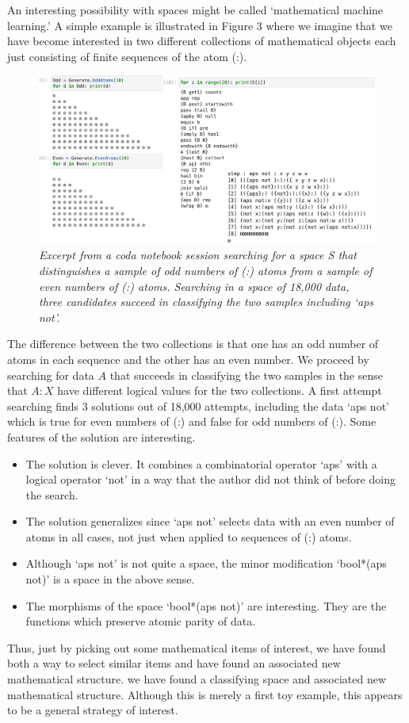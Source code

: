 \documentclass[11pt]{article}
\begin{document}
     An interesting possibility with spaces might be called `mathematical machine learning.'  A simple 
example is illustrated in Figure 3 where we imagine that we have become interested in two different 
collections of mathematical objects each just consisting of finite sequences of the atom (:).  
\begin{figure}[h]
\centering
\includegraphics[width=1.0\textwidth]{machine_learning.png}
\caption{{\it Excerpt from a coda notebook session searching for a space S that distinguishes a sample of 
odd numbers of (:) atoms from a sample of even numbers of (:) atoms.  Searching in a space of 18,000 data,
three candidates succeed in classifying the two samples including `aps not'.}}
\end{figure} 
The difference between the two collections is that one has an odd number of atoms in each sequence and 
the other has an even number.  We proceed by searching for data $A$ that succeeds in classifying 
the two samples in the sense that $A:X$ have different logical values for the two collections.   A first attempt 
searching finds 3 solutions out of 18,000 attempts, including the data  `aps not' which is true for 
even numbers of (:) and false for odd numbers of (:).  
Some features of the solution are interesting.
\begin{itemize}
\item The solution is clever.  It combines a combinatorial operator `aps' with a logical operator `not' 
in a way that the author did not think of before doing the search.  
\item The solution generalizes since `aps not' selects data with an even number of atoms in all cases, 
not just when applied to sequences of (:) atoms. 
\item Although `aps not' is not quite a space, the minor modification `bool*(aps not)' is a space
in the above sense. 
\item The morphisms of the space `bool*(aps not)' are interesting.  They are the functions 
which preserve atomic parity of data. 
\end{itemize}
Thus, just by picking out some mathematical items of interest, we have found both a way to 
select similar items and have found an associated new mathematical structure. 
we have found a classifying space and 
associated new mathematical structure. 
Although this is merely a first toy example, this appears to be a general strategy of interest.
\end{document}
